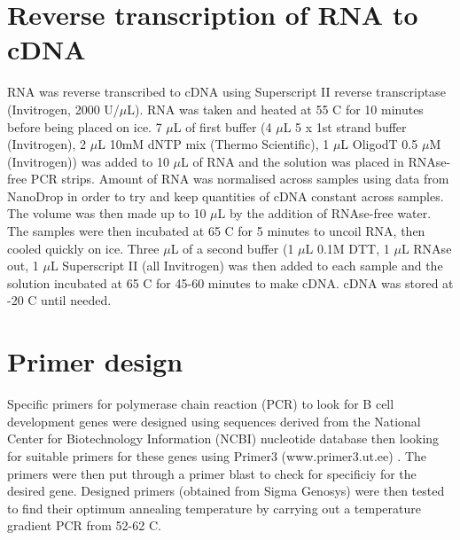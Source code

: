 \section{Reverse transcription of RNA to cDNA}

RNA was reverse transcribed to cDNA using Superscript II reverse transcriptase (Invitrogen, 2000 U/$\mu$L).
 RNA was taken and heated at 55 \textdegree C for 10 minutes before being placed on ice.
7 $\mu$L of first buffer (4 $\mu$L 5 x 1st strand buffer (Invitrogen), 2 $\mu$L 10mM dNTP mix (Thermo Scientific), 1 $\mu$L OligodT 0.5 $\mu$M (Invitrogen)) was added to 10 $\mu$L of RNA and the solution was placed in RNAse-free PCR strips.
Amount of RNA was normalised across samples using data from NanoDrop in order to try and keep quantities of cDNA constant across samples.
The volume was then made up to 10 $\mu$L by the addition of RNAse-free water.
The samples were then incubated at 65 \textdegree C for 5 minutes to uncoil RNA, then cooled quickly on ice.
Three $\mu$L of a second buffer (1 $\mu$L 0.1M DTT, 1 $\mu$L RNAse out, 1 $\mu$L Superscript II (all Invitrogen) was then added to each sample and the solution incubated at 65 \textdegree C for 45-60 minutes to make cDNA.
cDNA was stored at -20 \textdegree C until needed.

\section{Primer design}

Specific primers for polymerase chain reaction (PCR) to look for B cell development genes were designed using sequences derived from the National Center for Biotechnology Information (NCBI) nucleotide database \citep{NCBIdatabase} then looking for suitable primers for these genes using Primer3 (www.primer3.ut.ee) \citep{Primer3}.
The primers were then put through a primer blast \citep{Primerblast} to check for specificiy for the desired gene. 
Designed primers (obtained from Sigma Genosys) were then tested to find their optimum annealing temperature by carrying out a temperature gradient PCR from 52-62 \textdegree C.

